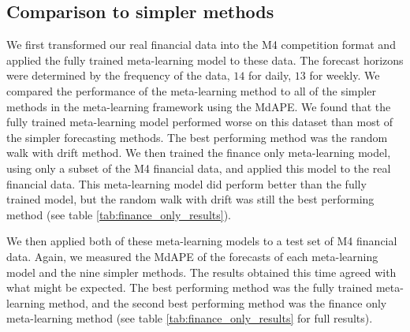 \documentclass[a4paper,12pt]{article}
\theoremstyle{definition}
\begin{document}
\subsection{Comparison to simpler methods}
We first transformed our real financial data into the M4 competition format and applied the fully trained meta-learning model to these data. The forecast horizons were determined by the frequency of the data, $14$ for daily, $13$ for weekly. We compared the performance of the meta-learning method to all of the simpler methods in the meta-learning framework using the MdAPE. We found that the fully trained meta-learning model performed worse on this dataset than most of the simpler forecasting methods. The best performing method was the random walk with drift method. We then trained the finance only meta-learning model, using only a subset of the M4 financial data, and applied this model to the real financial data. This meta-learning model did perform better than the fully trained model, but the random walk with drift was still the best performing method (see table \ref{tab:finance_only_results}).

We then applied both of these meta-learning models to a test set of M4 financial data. Again, we measured the MdAPE of the forecasts of each meta-learning model and the nine simpler methods. The results obtained this time agreed with what might be expected. The best performing method was the fully trained meta-learning method, and the second best performing method was the finance only meta-learning method (see table \ref{tab:finance_only_results} for full results).
\end{document}
